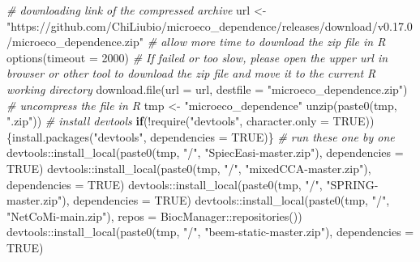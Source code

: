 \documentclass[
]{book}
\newenvironment{Shaded}{\begin{snugshade}}{\end{snugshade}}
\newcommand{\AttributeTok}[1]{\textcolor[rgb]{0.77,0.63,0.00}{#1}}
\newcommand{\CommentTok}[1]{\textcolor[rgb]{0.56,0.35,0.01}{\textit{#1}}}
\newcommand{\ConstantTok}[1]{\textcolor[rgb]{0.00,0.00,0.00}{#1}}
\newcommand{\ControlFlowTok}[1]{\textcolor[rgb]{0.13,0.29,0.53}{\textbf{#1}}}
\newcommand{\DecValTok}[1]{\textcolor[rgb]{0.00,0.00,0.81}{#1}}
\newcommand{\FunctionTok}[1]{\textcolor[rgb]{0.00,0.00,0.00}{#1}}
\newcommand{\NormalTok}[1]{#1}
\newcommand{\OtherTok}[1]{\textcolor[rgb]{0.56,0.35,0.01}{#1}}
\newcommand{\SpecialCharTok}[1]{\textcolor[rgb]{0.00,0.00,0.00}{#1}}
\newcommand{\StringTok}[1]{\textcolor[rgb]{0.31,0.60,0.02}{#1}}
\begin{document}
\begin{Shaded}
\begin{Highlighting}[]
\CommentTok{\# downloading link of the compressed archive}
\NormalTok{url }\OtherTok{\textless{}{-}} \StringTok{"https://github.com/ChiLiubio/microeco\_dependence/releases/download/v0.17.0/microeco\_dependence.zip"}
\CommentTok{\# allow more time to download the zip file in R}
\FunctionTok{options}\NormalTok{(}\AttributeTok{timeout =} \DecValTok{2000}\NormalTok{)}
\CommentTok{\# If failed or too slow, please open the upper url in browser or other tool to download the zip file and move it to the current R working directory}
\FunctionTok{download.file}\NormalTok{(}\AttributeTok{url =}\NormalTok{ url, }\AttributeTok{destfile =} \StringTok{"microeco\_dependence.zip"}\NormalTok{)}
\CommentTok{\# uncompress the file in R}
\NormalTok{tmp }\OtherTok{\textless{}{-}} \StringTok{"microeco\_dependence"}
\FunctionTok{unzip}\NormalTok{(}\FunctionTok{paste0}\NormalTok{(tmp, }\StringTok{".zip"}\NormalTok{))}
\CommentTok{\# install devtools}
\ControlFlowTok{if}\NormalTok{(}\SpecialCharTok{!}\FunctionTok{require}\NormalTok{(}\StringTok{"devtools"}\NormalTok{, }\AttributeTok{character.only =} \ConstantTok{TRUE}\NormalTok{))\{}\FunctionTok{install.packages}\NormalTok{(}\StringTok{"devtools"}\NormalTok{, }\AttributeTok{dependencies =} \ConstantTok{TRUE}\NormalTok{)\}}
\CommentTok{\# run these one by one}
\NormalTok{devtools}\SpecialCharTok{::}\FunctionTok{install\_local}\NormalTok{(}\FunctionTok{paste0}\NormalTok{(tmp, }\StringTok{"/"}\NormalTok{, }\StringTok{"SpiecEasi{-}master.zip"}\NormalTok{), }\AttributeTok{dependencies =} \ConstantTok{TRUE}\NormalTok{)}
\NormalTok{devtools}\SpecialCharTok{::}\FunctionTok{install\_local}\NormalTok{(}\FunctionTok{paste0}\NormalTok{(tmp, }\StringTok{"/"}\NormalTok{, }\StringTok{"mixedCCA{-}master.zip"}\NormalTok{), }\AttributeTok{dependencies =} \ConstantTok{TRUE}\NormalTok{)}
\NormalTok{devtools}\SpecialCharTok{::}\FunctionTok{install\_local}\NormalTok{(}\FunctionTok{paste0}\NormalTok{(tmp, }\StringTok{"/"}\NormalTok{, }\StringTok{"SPRING{-}master.zip"}\NormalTok{), }\AttributeTok{dependencies =} \ConstantTok{TRUE}\NormalTok{)}
\NormalTok{devtools}\SpecialCharTok{::}\FunctionTok{install\_local}\NormalTok{(}\FunctionTok{paste0}\NormalTok{(tmp, }\StringTok{"/"}\NormalTok{, }\StringTok{"NetCoMi{-}main.zip"}\NormalTok{), }\AttributeTok{repos =}\NormalTok{ BiocManager}\SpecialCharTok{::}\FunctionTok{repositories}\NormalTok{())}
\NormalTok{devtools}\SpecialCharTok{::}\FunctionTok{install\_local}\NormalTok{(}\FunctionTok{paste0}\NormalTok{(tmp, }\StringTok{"/"}\NormalTok{, }\StringTok{"beem{-}static{-}master.zip"}\NormalTok{), }\AttributeTok{dependencies =} \ConstantTok{TRUE}\NormalTok{)}

\end{Highlighting}
\end{Shaded}
\end{document}
